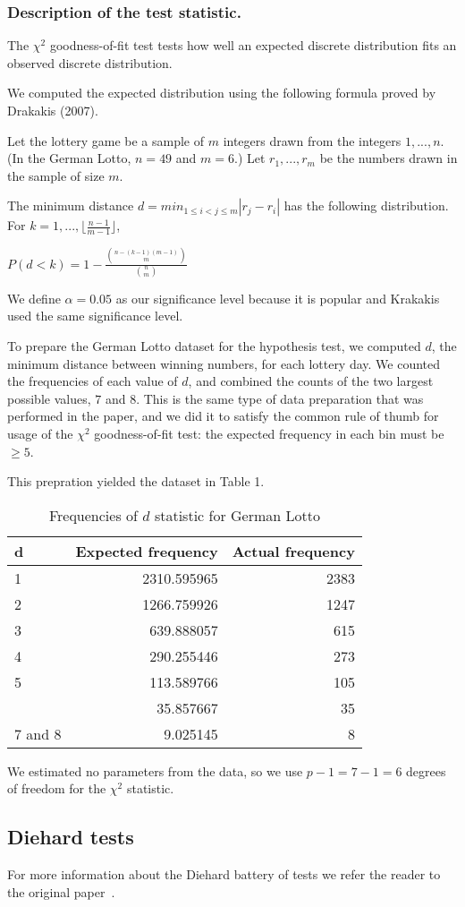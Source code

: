\subsubsection{Description of the test statistic.}

The $\chi^2$ goodness-of-fit test tests how well an expected discrete distribution fits
an observed discrete distribution. 

We computed the expected distribution using the following formula proved by Drakakis (2007).

Let the lottery game be a sample of $m$ integers drawn from the integers $1,...,n$. 
(In the German Lotto, $n = 49$ and $m = 6$.)
Let  $r_1,...,r_m$ be the numbers drawn in the sample of size $m$.

The minimum distance $d = min_{1 \leq i < j \leq m} | r_j - r_i |$ has the following distribution. For $k = 1,..., \lfloor \frac{n - 1}{m - 1} \rfloor$,

$P(d < k) = 1 - \frac{{n - (k - 1)(m - 1) \choose m}}{{n \choose m}}$

We define $\alpha = 0.05$ as our significance level because it is popular and Krakakis used
the same significance level.

To prepare the German Lotto dataset for the hypothesis test, we computed $d$, the minimum distance between winning numbers, for each 
lottery day. We counted the frequencies of each value of $d$, and combined the counts of the 
two largest possible values, $7$ and $8$. This is the same type of data preparation that was performed in the paper,
and we did it to satisfy the common rule of thumb for usage of the 
$\chi^2$ goodness-of-fit test: the expected frequency in each bin must be $\geq 5$.

This prepration yielded the dataset in Table 1.

\begin{table}

    \caption{Frequencies of $d$ statistic for German Lotto}
    \centering
    \begin{tabular}[t]{lrr}
    \toprule
    d & Expected frequency & Actual frequency\\
    \midrule
    1 & 2310.595965 & 2383\\
    2 & 1266.759926 & 1247\\
    3 & 639.888057 & 615\\
    4 & 290.255446 & 273\\
    5 & 113.589766 & 105\\
    \addlinespace
    6 & 35.857667 & 35\\
    7 and 8 & 9.025145 & 8\\
    \bottomrule
    \end{tabular}
    \end{table}

We estimated no parameters from the data, so we use
$p - 1 = 7 - 1 = 6$ degrees of freedom for the $\chi^2$ statistic.

\subsection{Diehard tests}

For more information about the Diehard battery of tests we refer the reader to the original paper~\cite{currentRNG}.
